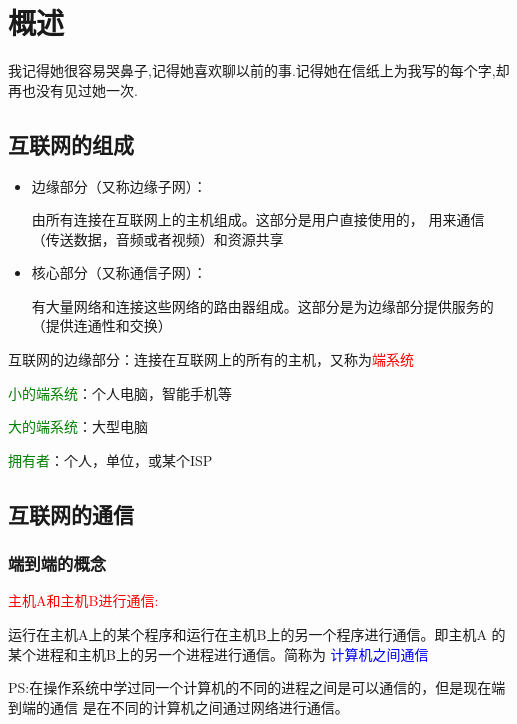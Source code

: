 \chapter{概述}
\begin{center}
    \textcolor[RGB]{255, 0, 0}{\faHeart}我记得她很容易哭鼻子,记得她喜欢聊以前的事.记得她在信纸上为我写的每个字,却再也没有见过她一次.\textcolor[RGB]{255, 0, 0}{\faHeart}
\end{center}
\vspace{-5pt}
\begin{center}
\end{center}

\section{互联网的组成}
\begin{itemize}
    \item 边缘部分（又称边缘子网）：
    
    由所有连接在互联网上的主机组成。这部分是用户直接使用的，
    用来通信（传送数据，音频或者视频）和资源共享
    \item 核心部分（又称通信子网）：
    
    有大量网络和连接这些网络的路由器组成。这部分是为边缘部分提供服务的
    （提供连通性和交换）
\end{itemize}
互联网的边缘部分：连接在互联网上的所有的主机，又称为\textcolor{red}{端系统}

\textcolor{green}{小的端系统}：个人电脑，智能手机等

\textcolor{green}{大的端系统}：大型电脑

\textcolor{green}{拥有者}：个人，单位，或某个ISP

\section{互联网的通信}
\subsection{端到端的概念}
\textcolor{red}{主机A和主机B进行通信:}

运行在主机A上的某个程序和运行在主机B上的另一个程序进行通信。即主机A
的某个进程和主机B上的另一个进程进行通信。简称为
\textcolor{blue}{计算机之间通信}

PS:在操作系统中学过同一个计算机的不同的进程之间是可以通信的，但是现在端到端的通信
是在不同的计算机之间通过网络进行通信。

